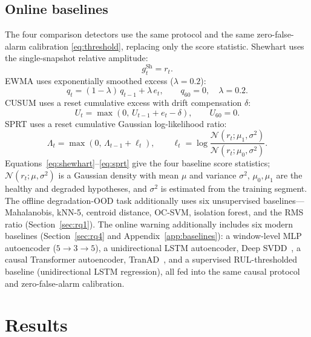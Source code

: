 \documentclass[journal]{IEEEtran}
\begin{document}
\subsection{Online baselines}
The four comparison detectors use the same protocol and the same zero-false-alarm calibration \eqref{eq:threshold}, replacing only the score statistic. Shewhart uses the single-snapshot relative amplitude:
\begin{equation}
g_t^{\mathrm{Sh}}=r_t.
\label{eq:shewhart}
\end{equation}
EWMA uses exponentially smoothed excess ($\lambda=0.2$):
\begin{equation}
q_t=(1-\lambda)\,q_{t-1}+\lambda\,e_t,\qquad q_{60}=0,\quad\lambda=0.2.
\label{eq:ewma}
\end{equation}
CUSUM uses a reset cumulative excess with drift compensation $\delta$:
\begin{equation}
U_t=\max\left(0,\,U_{t-1}+e_t-\delta\right),\qquad U_{60}=0.
\label{eq:cusum}
\end{equation}
SPRT uses a reset cumulative Gaussian log-likelihood ratio:
\begin{equation}
\Lambda_t=\max\left(0,\,\Lambda_{t-1}+\ell_t\right),\qquad
\ell_t=\log\frac{\mathcal{N}\left(r_t;\mu_1,\sigma^2\right)}{\mathcal{N}\left(r_t;\mu_0,\sigma^2\right)}.
\label{eq:sprt}
\end{equation}
Equations~\eqref{eq:shewhart}--\eqref{eq:sprt} give the four baseline score statistics; $\mathcal{N}(r_t;\mu,\sigma^2)$ is a Gaussian density with mean $\mu$ and variance $\sigma^2$, $\mu_0,\mu_1$ are the healthy and degraded hypotheses, and $\sigma^2$ is estimated from the training segment. The offline degradation-OOD task additionally uses six unsupervised baselines---Mahalanobis, kNN-5, centroid distance, OC-SVM, isolation forest, and the RMS ratio (Section~\ref{sec:rq1}). The online warning additionally includes six modern baselines (Section~\ref{sec:rq4} and Appendix~\ref{app:baselines}): a window-level MLP autoencoder ($5\to3\to5$), a unidirectional LSTM autoencoder, Deep SVDD~\cite{ruff2018}, a causal Transformer autoencoder, TranAD~\cite{tuli2022tranad}, and a supervised RUL-thresholded baseline (unidirectional LSTM regression), all fed into the same causal protocol and zero-false-alarm calibration.

\section{Results}\label{sec:results}
\end{document}
